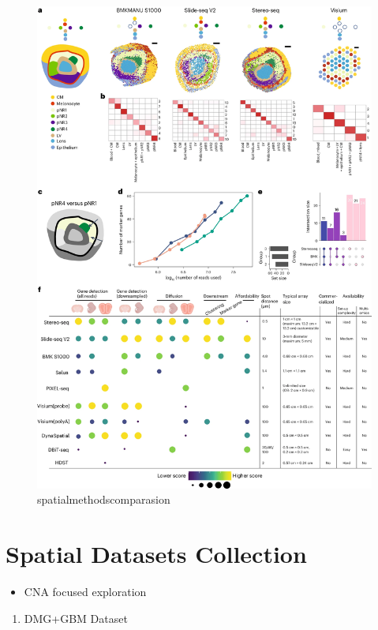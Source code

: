 \documentclass[
]{book}
\providecommand{\tightlist}{%
  \setlength{\itemsep}{0pt}\setlength{\parskip}{0pt}}
\begin{document}
\begin{figure}
\centering
\includegraphics{./figs/spatialtech/spatialmethodscomparasion.webp}
\caption{spatialmethodscomparasion}
\end{figure}

\hypertarget{spatial-datasets-collection}{%
\section{Spatial Datasets Collection}\label{spatial-datasets-collection}}

\begin{itemize}
\tightlist
\item
  CNA focused exploration
\end{itemize}

\begin{enumerate}
\def\labelenumi{\arabic{enumi}.}
\tightlist
\item
  DMG+GBM Dataset
\end{enumerate}
\end{document}
